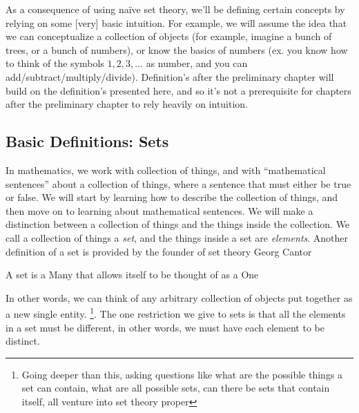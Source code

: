 \documentclass{book}
\begin{document}
As a consequence of using na\"ive set theory, we'll be defining certain concepts by relying on some [very] basic intuition. For
example, we will assume the idea that we can conceptualize a collection of objects (for example, imagine a bunch
of trees, or a bunch of numbers), or know the basics of numbers (ex. you know how to think of the symbols $1,2,3,...$ as
number, and you can add/subtract/multiply/divide). Definition's after the preliminary chapter will build on the definition's presented
here, and so it's not a prerequisite for chapters after the preliminary chapter to rely heavily on intuition.


\subsection*{Basic Definitions: Sets}



In mathematics, we work with collection of things, and with ``mathematical sentences'' about a collection of things,
where a sentence that must either be true or false. We will start by learning how to describe the collection of things,
and then move on to learning about mathematical sentences. We will make a distinction between a collection of things and
the things inside the collection. We call a collection of things a \emph{set}, and the things inside a set are
\emph{elements}. Another definition of a set is provided by the founder of set theory Georg Cantor

\begin{quoting}
	A set is a Many that allows itself to be thought of as a One
\end{quoting}

In other words, we can think of any arbitrary collection of objects put together as a new single entity. \footnote{Going
deeper than this, asking questions like what are the possible things a set can contain, what are all possible sets, can
there be sets that contain itself, all venture into set theory proper}. The one restriction we give to sets is that all the
elements in a set must be different, in other words, we must have each element to be distinct.
\end{document}
